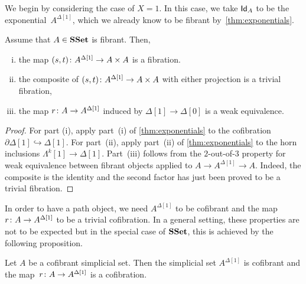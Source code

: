 \documentclass[reqno,10pt,a4paper,oneside,draft]{amsart}
\begin{document}
\medskip

We begin by considering the case of $X = 1$. In this case, we  take $\mathsf{Id}_A$ to 
be the exponential~$A^{\Delta[1]}$, which we already know to be fibrant by~\cref{thm:exponentials}.


\begin{lemma} Assume that $A \in \mathbf{SSet}$ is fibrant. Then,
\begin{enumerate}[(i)] 
\item the map $(s,t) \colon A^{\Delta[1]} \rightarrow A \times A$ is a fibration.
\item the composite of $(s, t) \colon A^{\Delta[1]} \rightarrow A \times A$ with either projection is a trivial fibration,
\item the map $r \colon A \rightarrow A^{\Delta[1]}$ induced by $\Delta[1] \rightarrow \Delta[0]$ is a weak equivalence.
\end{enumerate}
\end{lemma} 

\begin{proof}
For part (i), apply part~(i) of \cref{thm:exponentials} to the cofibration $\partial \Delta[1]  \hookrightarrow \Delta[1]$. For part~(ii), apply part~(ii) of \cref{thm:exponentials} to the horn inclusions $\Lambda^k[1]  \rightarrow \Delta[1]$. Part~(iii) follows from the $2$-out-of-$3$ property for weak equivalence between fibrant objects applied to $A \rightarrow A^{\Delta[1]} \rightarrow A$. Indeed, the
composite is the identity and the second factor has just been proved to be a trivial fibration.
\end{proof}


In order to have a path object, we need $A^{\Delta[1]}$ to be cofibrant and the map $r \colon A \rightarrow A^{\Delta[1]}$ to be a trivial cofibration. In a general setting, these properties are not to be expected
but in the special case of $\mathbf{SSet}$, this is achieved by the following proposition.

\begin{proposition}\label{proposition:PathObjectCofibrant}
Let $A$ be a cofibrant simplicial set. Then the simplicial set $A^{\Delta[1]}$ is cofibrant and the map~$r \colon A \rightarrow A^{\Delta[1]}$ is a cofibration.
\end{proposition}
\end{document}
